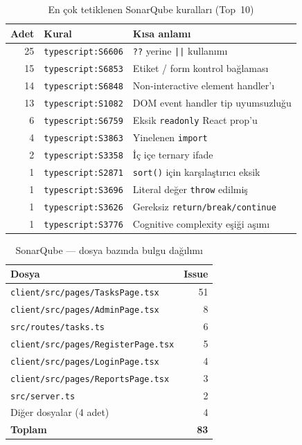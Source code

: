 \documentclass[conference]{IEEEtran}
\begin{document}
\begin{table}[htbp]
\caption{En çok tetiklenen SonarQube kuralları (Top~10)}
\label{tab:sonar-rules}
\centering
\begin{tabular}{@{}rll@{}}
\toprule
\textbf{Adet} & \textbf{Kural} & \textbf{Kısa anlamı} \\
\midrule
25 & \texttt{typescript:S6606} & \texttt{??} yerine \texttt{||} kullanımı \\
15 & \texttt{typescript:S6853} & Etiket / form kontrol bağlaması \\
14 & \texttt{typescript:S6848} & Non-interactive element handler'ı \\
13 & \texttt{typescript:S1082} & DOM event handler tip uyumsuzluğu \\
 6 & \texttt{typescript:S6759} & Eksik \texttt{readonly} React prop'u \\
 4 & \texttt{typescript:S3863} & Yinelenen \texttt{import} \\
 2 & \texttt{typescript:S3358} & İç içe ternary ifade \\
 1 & \texttt{typescript:S2871} & \texttt{sort()} için karşılaştırıcı eksik \\
 1 & \texttt{typescript:S3696} & Literal değer \texttt{throw} edilmiş \\
 1 & \texttt{typescript:S3626} & Gereksiz \texttt{return/break/continue} \\
 1 & \texttt{typescript:S3776} & Cognitive complexity eşiği aşımı \\
\bottomrule
\end{tabular}
\end{table}

\begin{table}[htbp]
\caption{SonarQube — dosya bazında bulgu dağılımı}
\label{tab:sonar-files}
\centering
\begin{tabular}{@{}lr@{}}
\toprule
\textbf{Dosya} & \textbf{Issue} \\
\midrule
\texttt{client/src/pages/TasksPage.tsx}     & 51 \\
\texttt{client/src/pages/AdminPage.tsx}     &  8 \\
\texttt{src/routes/tasks.ts}                &  6 \\
\texttt{client/src/pages/RegisterPage.tsx}  &  5 \\
\texttt{client/src/pages/LoginPage.tsx}     &  4 \\
\texttt{client/src/pages/ReportsPage.tsx}   &  3 \\
\texttt{src/server.ts}                      &  2 \\
Diğer dosyalar (4 adet) & 4 \\
\midrule
\textbf{Toplam} & \textbf{83} \\
\bottomrule
\end{tabular}
\end{table}
\end{document}
